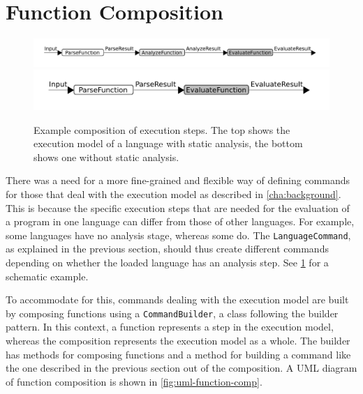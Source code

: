 \makeatletter
\Gscale@div\imgscale\textwidth{\wd0}
\makeatother
%
\section{Function Composition}
\label{sec:function-comp}
\begin{figure}[t]
  \includegraphics[scale=\imgscale]{unit-flow}
  \includegraphics[scale=\imgscale]{unit-flow-no-analyze}
  \caption{Example composition of execution steps. The top shows the
    execution model of a language with static analysis,
    the bottom shows one without static analysis. }
  \label{fig:unit-flow}
\end{figure}

There was a need for a more fine-grained and flexible way of defining commands
for those that deal with the execution model as described in
\cref{cha:background}. This is because the specific
execution steps that are needed for the evaluation of a program in one language
can differ from those of other languages. For example, some languages
have no analysis stage, whereas some do. The \texttt{LanguageCommand}, as
explained in the previous section, should thus create different
commands depending on whether the loaded language has an
analysis step. See \cref{fig:unit-flow} for a schematic example.

To accommodate for this, commands dealing with the execution model are built by
composing functions using a \texttt{CommandBuilder}, a class following the
builder pattern. In this context, a function represents a step in the execution
model, whereas the composition represents the execution model as a whole. The
builder has methods for composing functions and a method for building a command
like the one described in the previous section out of the composition. A UML
diagram of function composition is shown in \cref{fig:uml-function-comp}.

